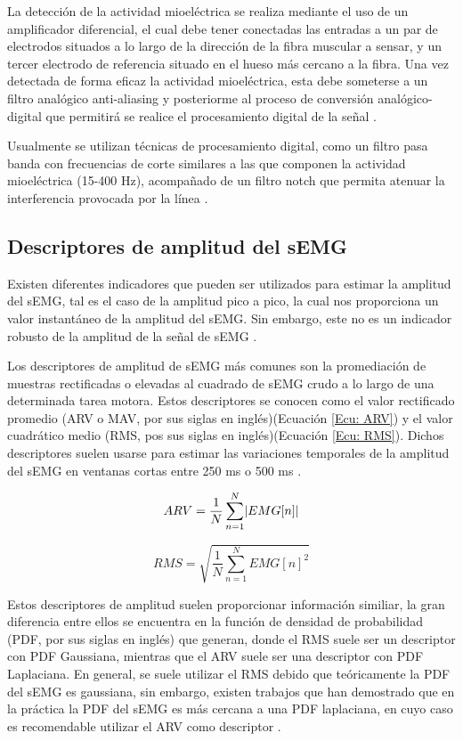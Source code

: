 La detección de la actividad mioeléctrica se realiza mediante el uso de un amplificador diferencial, el cual debe tener conectadas las entradas a un par de electrodos situados a lo largo de la dirección de la fibra muscular a sensar, y un tercer electrodo de referencia situado en el hueso más cercano a la fibra. Una vez detectada de forma eficaz la actividad mioeléctrica, esta debe someterse a un filtro analógico anti-aliasing y posteriorme al proceso de conversión analógico-digital que permitirá se realice el procesamiento digital de la señal \cite{Cavalcanti-Garcia2009}.

Usualmente se utilizan técnicas de procesamiento digital, como un filtro pasa banda con frecuencias de corte similares a las que componen la actividad mioeléctrica (15-400 Hz), acompañado de un filtro notch que permita atenuar la interferencia provocada por la línea \cite{Cavalcanti-Garcia2009}.

\subsection{Descriptores de amplitud del sEMG}
Existen diferentes indicadores que pueden ser utilizados para estimar la amplitud del sEMG, tal es el caso de la amplitud pico a pico, la cual nos proporciona un valor instantáneo de la amplitud del sEMG. Sin embargo, este no es un indicador robusto de la amplitud de la señal de sEMG \cite{Cavalcanti-Garcia2009}.

Los descriptores de amplitud de sEMG más comunes son la promediación de muestras rectificadas o elevadas al cuadrado de sEMG crudo a lo largo de una determinada tarea motora. Estos descriptores se conocen como el valor rectificado promedio (ARV o MAV, por sus siglas en inglés)(Ecuación \ref{Ecu: ARV}) y el valor cuadrático medio (RMS, pos sus siglas en inglés)(Ecuación \ref{Ecu: RMS}). Dichos descriptores suelen usarse para estimar las variaciones temporales de la amplitud del sEMG en ventanas cortas entre 250 ms o 500 ms \cite{Cavalcanti-Garcia2009}.

\begin{equation}
	ARV = \frac{1}{N} \sum_{n=1}^{N} \lvert EMG[n]\rvert
	\label{Ecu: ARV}
\end{equation}

\begin{equation}
	RMS = \sqrt{\frac{1}{N} \sum_{n=1}^{N} EMG[n]^{2}}
	\label{Ecu: RMS}
\end{equation}

Estos descriptores de amplitud suelen proporcionar información similiar, la gran diferencia entre ellos se encuentra en la función de densidad de probabilidad (PDF, por sus siglas en inglés) que generan, donde el RMS suele ser un descriptor con PDF Gaussiana, mientras que el ARV suele ser una descriptor con PDF Laplaciana. En general, se suele utilizar el RMS debido que teóricamente la PDF del sEMG es gaussiana, sin embargo, existen trabajos que han demostrado que en la práctica la PDF del sEMG es más cercana a una PDF laplaciana, en cuyo caso es recomendable utilizar el ARV como descriptor \cite{Clancy1999}\cite{Phinyomark2013}.